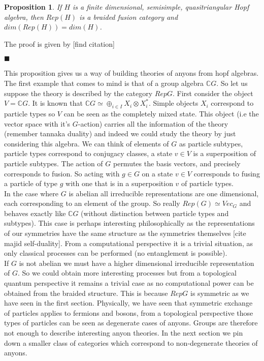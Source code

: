 \documentclass{article}
\newtheorem{proposition}[theorem]{Proposition}
\newenvironment{proof}[1][Proof]{\begin{trivlist}
\item[\hskip \labelsep {\bfseries #1}]}{\begin{flushright}$\blacksquare$\end{flushright} \end{trivlist}}
\begin{document}
\begin{proposition}
	If $H$ is a finite dimensional, semisimple, quasitriangular Hopf algebra, then $Rep(H)$ is a braided fusion category and $dim(Rep(H))=dim(H)$.
\end{proposition}
\begin{proof}
	The proof is given by [find citation]
\end{proof}
This proposition gives us a way of building theories of anyons from hopf algebras.\\
The first example that comes to mind is that of a group algebra $\mathbb{C}G$. So let us suppose the theory is described by the category $RepG$. 
First consider the object $V= \mathbb{C}G$. It is known that $\mathbb{C}G \simeq \oplus_{i \in I} X_i \otimes X_i^*$. Simple objects $X_i$ correspond to particle types so $V$ can be seen as the completely mixed state. This object (i.e the vector space with it's $G$-action) carries all the information of the theory (remember tannaka duality) and indeed we could study the theory by just considering this algebra. We can think of elements of $G$ as particle subtypes, particle types correspond to conjugacy classes, a state $v \in V$ is a superposition of particle subtypes. The action of $G$ permutes the basis vectors, and precisely corresponds to fusion. So acting with $g \in G$ on a state $v \in V$ corresponds to fusing a particle of type $g$ with one that is in a superposition $v$ of particle types.\\
In the case where $G$ is abelian all irreducible representations are one dimensional, each corresponding to an element of the group. So really $Rep(G) \simeq Vec_G$ and behaves exactly like $\mathbb{C}G$ (without distinction between particle types and subtypes). This case is perhaps interesting philosophically as the representations of our symmetries have the same structure as the symmetries themselves [cite majid self-duality]. From a computational perspective it is a trivial situation, as only classical processes can be performed (no entanglement is possible).\\
If $G$ is not abelian we must have a higher dimensional irreducible representation of $G$. So we could obtain more interesting processes but from a topological quantum perspective it remains a trivial case as no computational power can be obtained from the braided structure. This is because $RepG$ is symmetric as we have seen in the first section. Physically, we have seen that symmetric exchange of particles applies to fermions and bosons, from a topological perspective those types of particles can be seen as degenerate cases of anyons.
Groups are therefore not enough to describe interesting anyon theories. In the next section we pin down a smaller class of categories which correspond to non-degenerate theories of anyons.
\end{document}
